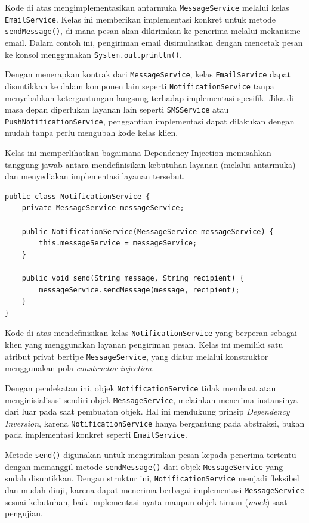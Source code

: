 Kode di atas mengimplementasikan antarmuka \texttt{MessageService} melalui kelas \texttt{EmailService}. Kelas ini memberikan implementasi konkret untuk metode \texttt{sendMessage()}, di mana pesan akan dikirimkan ke penerima melalui mekanisme email. Dalam contoh ini, pengiriman email disimulasikan dengan mencetak pesan ke konsol menggunakan \texttt{System.out.println()}.

Dengan menerapkan kontrak dari \texttt{MessageService}, kelas \texttt{EmailService} dapat disuntikkan ke dalam komponen lain seperti \texttt{NotificationService} tanpa menyebabkan ketergantungan langsung terhadap implementasi spesifik. Jika di masa depan diperlukan layanan lain seperti \texttt{SMSService} atau \texttt{PushNotificationService}, penggantian implementasi dapat dilakukan dengan mudah tanpa perlu mengubah kode kelas klien.

Kelas ini memperlihatkan bagaimana Dependency Injection memisahkan tanggung jawab antara mendefinisikan kebutuhan layanan (melalui antarmuka) dan menyediakan implementasi layanan tersebut.


\begin{lstlisting}[style=JavaStyle, caption={Kelas Client yang Menerima Ketergantungan Melalui Konstruktor}, label={lst:di-client}]
public class NotificationService {
	private MessageService messageService;
	
	public NotificationService(MessageService messageService) {
		this.messageService = messageService;
	}
	
	public void send(String message, String recipient) {
		messageService.sendMessage(message, recipient);
	}
}
\end{lstlisting}

Kode di atas mendefinisikan kelas \texttt{NotificationService} yang berperan sebagai klien yang menggunakan layanan pengiriman pesan. Kelas ini memiliki satu atribut privat bertipe \texttt{MessageService}, yang diatur melalui konstruktor menggunakan pola \textit{constructor injection}. 

Dengan pendekatan ini, objek \texttt{NotificationService} tidak membuat atau menginisialisasi sendiri objek \texttt{MessageService}, melainkan menerima instansinya dari luar pada saat pembuatan objek. Hal ini mendukung prinsip \textit{Dependency Inversion}, karena \texttt{NotificationService} hanya bergantung pada abstraksi, bukan pada implementasi konkret seperti \texttt{EmailService}.

Metode \texttt{send()} digunakan untuk mengirimkan pesan kepada penerima tertentu dengan memanggil metode \texttt{sendMessage()} dari objek \texttt{MessageService} yang sudah disuntikkan. Dengan struktur ini, \texttt{NotificationService} menjadi fleksibel dan mudah diuji, karena dapat menerima berbagai implementasi \texttt{MessageService} sesuai kebutuhan, baik implementasi nyata maupun objek tiruan (\textit{mock}) saat pengujian.


